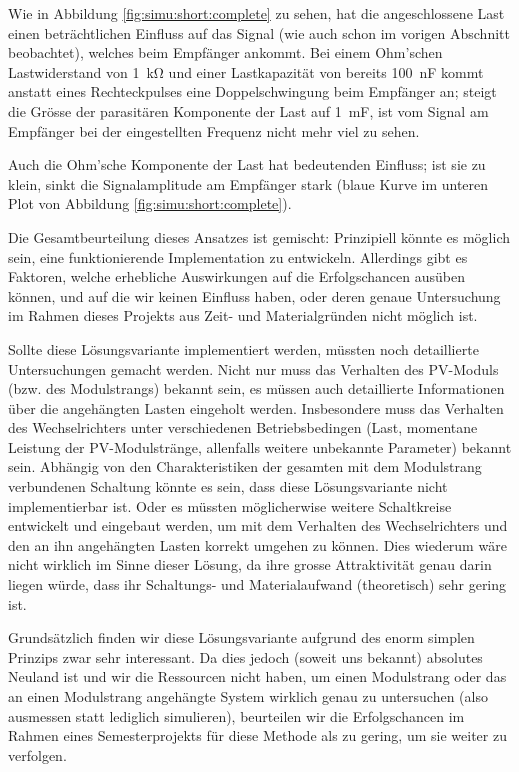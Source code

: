Wie   in   Abbildung   \ref{fig:simu:short:complete}   zu   sehen,   hat   die
angeschlossene Last einen  betr\"achtlichen Einfluss auf das  Signal (wie auch
schon im vorigen Abschnitt  beobachtet), welches beim Empf\"anger ankommt. Bei
einem Ohm'schen Lastwiderstand von \SI{1}{\kilo\ohm} und einer Lastkapazit\"at
von  bereits \SI{100}{\nano\farad}  kommt  anstatt  eines Rechteckpulses  eine
Doppelschwingung beim  Empf\"anger an;  steigt die Gr\"osse  der parasit\"aren
Komponente der  Last auf \SI{1}{\milli\farad},  ist vom Signal  am Empf\"anger
bei der eingestellten Frequenz nicht mehr viel zu sehen.

Auch die  Ohm'sche Komponente der  Last hat  bedeutenden Einfluss; ist  sie zu
klein, sinkt die Signalamplitude am  Empf\"anger stark (blaue Kurve im unteren
Plot von Abbildung \ref{fig:simu:short:complete}).

Die Gesamtbeurteilung  dieses Ansatzes  ist gemischt: Prinzipiell  k\"onnte es
m\"oglich sein, eine  funktionierende Implementation zu entwickeln. Allerdings
gibt  es  Faktoren,  welche  erhebliche Auswirkungen  auf  die  Erfolgschancen
aus\"uben k\"onnen, und  auf die wir keinen Einfluss haben,  oder deren genaue
Untersuchung im Rahmen  dieses Projekts aus Zeit-  und Materialgr\"unden nicht
m\"oglich ist.

Sollte   diese   L\"osungsvariante   implementiert  werden,   m\"ussten   noch
detaillierte Untersuchungen  gemacht werden. Nicht nur muss  das Verhalten des
PV-Moduls (bzw. des Modulstrangs) bekannt  sein, es m\"ussen auch detaillierte
Informationen \"uber die angeh\"angten  Lasten eingeholt werden.  Insbesondere
muss das  Verhalten des  Wechselrichters unter  verschiedenen Betriebsbedingen
(Last, momentane Leistung der PV-Modulstr\"ange, allenfalls weitere unbekannte
Parameter)  bekannt sein. Abh\"angig  von  den  Charakteristiken der  gesamten
mit  dem  Modulstrang  verbundenen  Schaltung k\"onnte  es  sein,  dass  diese
L\"osungsvariante nicht implementierbar ist. Oder es m\"ussten m\"oglicherwise
weitere Schaltkreise entwickelt und eingebaut werden, um mit dem Verhalten des
Wechselrichters  und  den  an  ihn angeh\"angten  Lasten  korrekt  umgehen  zu
k\"onnen. Dies wiederum  w\"are nicht  wirklich im  Sinne dieser  L\"osung, da
ihre grosse Attraktivit\"at  genau darin liegen w\"urde,  dass ihr Schaltungs-
und Materialaufwand (theoretisch) sehr gering ist.

Grunds\"atzlich finden wir diese  L\"osungsvariante aufgrund des enorm simplen
Prinzips zwar sehr interessant. Da dies  jedoch (soweit uns bekannt) absolutes
Neuland ist und wir die Ressourcen  nicht haben, um einen Modulstrang oder das
an einen Modulstrang  angeh\"angte System wirklich genau  zu untersuchen (also
ausmessen statt  lediglich simulieren),  beurteilen wir die  Erfolgschancen im
Rahmen eines Semesterprojekts f\"ur diese Methode als zu gering, um sie weiter
zu verfolgen.


